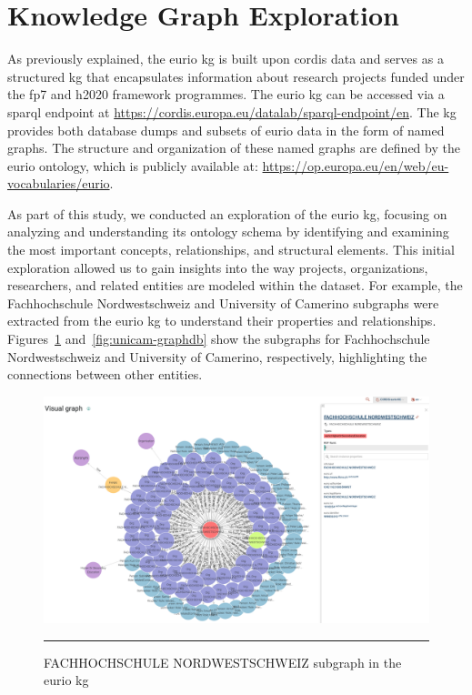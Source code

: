 \section*{Knowledge Graph Exploration}
As previously explained, the \gls{eurio} \acrlong{kg} \cite{CORDIS_EURIO_2022} is built upon \gls{cordis} data and serves as a structured \gls{kg} that encapsulates information about research projects funded under the \gls{fp7} and \gls{h2020} framework programmes.
The \gls{eurio} \gls{kg} can be accessed via a \gls{sparql} endpoint at \url{https://cordis.europa.eu/datalab/sparql-endpoint/en}.
The \gls{kg} provides both database dumps and subsets of \gls{eurio} data in the form of named graphs.
The structure and organization of these named graphs are defined by the \gls{eurio} ontology, which is publicly available at: \url{https://op.europa.eu/en/web/eu-vocabularies/eurio}.

As part of this study, we conducted an exploration of the \gls{eurio} \gls{kg}, focusing on analyzing and understanding its ontology schema by identifying and examining the most important concepts, relationships, and structural elements.
This initial exploration allowed us to gain insights into the way projects, organizations, researchers, and related entities are modeled within the dataset.
For example, the Fachhochschule Nordwestschweiz and University of Camerino  subgraphs were extracted from the \gls{eurio} \gls{kg} to understand their properties and relationships.
Figures~\ref{fig:fhnw-graphdb} and~\ref{fig:unicam-graphdb} show the subgraphs for Fachhochschule Nordwestschweiz and University of Camerino, respectively, highlighting the connections between other entities.

\begin{figure}[htbp]
    \centering
 \includegraphics[width=.8\textwidth]{figures/architecture/graphdb-fhnw.png}
     \rule{35em}{0.5pt}
    \caption{FACHHOCHSCHULE NORDWESTSCHWEIZ subgraph in the \gls{eurio} \gls{kg}}
 \label{fig:fhnw-graphdb}
\end{figure}


